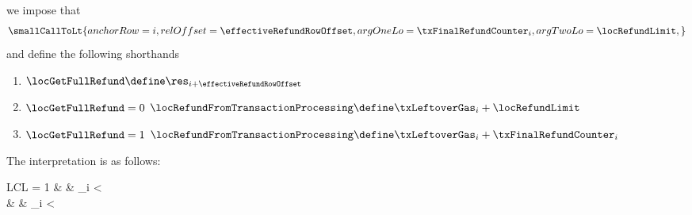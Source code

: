 \item[\underline{\underline{Row n$°(i + \effectiveRefundRowOffset)$: effective refund:}}]
	we impose that
	\[
		\smallCallToLt {
			anchorRow = i                         ,
			relOffset = \effectiveRefundRowOffset ,
			argOneLo  = \txFinalRefundCounter_{i} ,
			argTwoLo  = \locRefundLimit           ,
		}
	\]
	and define the following shorthands
	\begin{enumerate}
		\item $\locGetFullRefund \define \res_{i + \effectiveRefundRowOffset}$
		\item \If $\locGetFullRefund = 0$ \Then $\locRefundFromTransactionProcessing \define \txLeftoverGas _{i} + \locRefundLimit$
		\item \If $\locGetFullRefund = 1$ \Then $\locRefundFromTransactionProcessing \define \txLeftoverGas _{i} + \txFinalRefundCounter _{i}$
	\end{enumerate}
	\saNote{}
	The interpretation is as follows:
	\begin{IEEEeqnarray*}{LCL}
		\locGetFullRefund = 1 & \iff & \txFinalRefundCounter _{i} < \locRefundLimit                                                                     \\
                                      & \iff & \txFinalRefundCounter _{i} < \left\lfloor{}\maxRefundQuotient\right\rfloor \\
	\end{IEEEeqnarray*}
